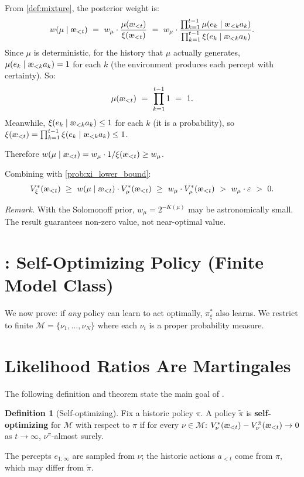 \documentclass[fontsize=11pt, parskip=half]{scrartcl}
\theoremstyle{definition}
\newtheorem{definition}[theorem]{Definition}
\newenvironment{solution}{%
    \begin{tcolorbox}[colback=black!5!white, colframe=black!50!white,
      title={\textbf{Solution}}, fonttitle=\normalfont, breakable]
  }{\end{tcolorbox}}
\newenvironment{solution}{\expandafter\comment}{\expandafter\endcomment}
\newcommand{\cM}{\mathcal{M}}
\newcommand{\aes}{\textnormal{\ae}}
\begin{document}
\begin{solution}
From \cref{def:mixture}, the posterior weight is:
\[
    w(\mu \mid \aes_{<t})
    ~=~ w_\mu \cdot \frac{\mu(\aes_{<t})}{\xi(\aes_{<t})}
    ~=~ w_\mu \cdot \frac{\prod_{k=1}^{t-1} \mu(e_k \mid \aes_{<k} a_k)}{\prod_{k=1}^{t-1} \xi(e_k \mid \aes_{<k} a_k)}.
\]
Since $\mu$ is deterministic, for the history that $\mu$ actually generates, $\mu(e_k \mid \aes_{<k} a_k) = 1$ for each $k$ (the environment produces each percept with certainty). So:
\[
    \mu(\aes_{<t}) ~=~ \prod_{k=1}^{t-1} 1 ~=~ 1.
\]
Meanwhile, $\xi(e_k \mid \aes_{<k} a_k) \leq 1$ for each $k$ (it is a probability), so $\xi(\aes_{<t}) = \prod_{k=1}^{t-1} \xi(e_k \mid \aes_{<k} a_k) \leq 1$.

Therefore $w(\mu \mid \aes_{<t}) = w_\mu \cdot 1 / \xi(\aes_{<t}) \geq w_\mu$.

Combining with \cref{prob:xi_lower_bound}:
\[
    V_\xi^*(\aes_{<t})
    ~\geq~ w(\mu \mid \aes_{<t}) \cdot V_\mu^*(\aes_{<t})
    ~\geq~ w_\mu \cdot V_\mu^*(\aes_{<t})
    ~>~ w_\mu \cdot \varepsilon
    ~>~ 0.
\]
\end{solution}

\textit{Remark.} With the Solomonoff prior, $w_\mu = 2^{-K(\mu)}$ may be astronomically small. The result guarantees non-zero value, not near-optimal value.


\section*{: Self-Optimizing Policy (Finite Model Class)}

We now prove: if \emph{any} policy can learn to act optimally, $\pi_\xi^*$ also learns. We restrict to finite $\cM = \{\nu_1, \ldots, \nu_N\}$ where each $\nu_i$ is a proper probability measure.

\section{Likelihood Ratios Are Martingales}\label{prob:supermartingale}

The following definition and theorem state the main goal of .

\begin{definition}[Self-optimizing]\label{def:selfopt}
Fix a historic policy $\pi$. A policy $\tilde\pi$ is \textbf{self-optimizing} for $\cM$ with respect to $\pi$ if for every $\nu \in \cM$:
$V_\nu^*(\aes_{<t}) - V_\nu^{\tilde\pi}(\aes_{<t}) \to 0$ as $t \to \infty$, $\nu^\pi$-almost surely.

The percepts $e_{1:\infty}$ are sampled from $\nu$; the historic actions $a_{<t}$ come from $\pi$, which may differ from $\tilde\pi$.
\end{definition}
\end{document}
